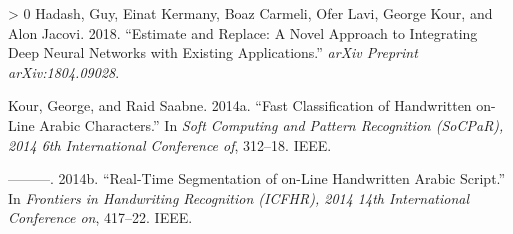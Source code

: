 \documentclass{article}
\newlength{\cslhangindent}
\newenvironment{CSLReferences}[3] %
 {%
  \setlength{\parindent}{0pt}
  \ifodd #1 \everypar{\setlength{\hangindent}{\cslhangindent}}\ignorespaces\fi
  \ifnum #2 > 0
  \setlength{\parskip}{#2\baselineskip}
  \fi
 }%
 {}
\begin{document}
\hypertarget{refs}{}
\begin{CSLReferences}{1}{0}
\leavevmode\hypertarget{ref-hadash2018estimate}{}%
Hadash, Guy, Einat Kermany, Boaz Carmeli, Ofer Lavi, George Kour, and
Alon Jacovi. 2018. {``Estimate and Replace: A Novel Approach to
Integrating Deep Neural Networks with Existing Applications.''}
\emph{arXiv Preprint arXiv:1804.09028}.

\leavevmode\hypertarget{ref-kour2014fast}{}%
Kour, George, and Raid Saabne. 2014a. {``Fast Classification of
Handwritten on-Line Arabic Characters.''} In \emph{Soft Computing and
Pattern Recognition (SoCPaR), 2014 6th International Conference of},
312--18. IEEE.

\leavevmode\hypertarget{ref-kour2014real}{}%
---------. 2014b. {``Real-Time Segmentation of on-Line Handwritten
Arabic Script.''} In \emph{Frontiers in Handwriting Recognition (ICFHR),
2014 14th International Conference on}, 417--22. IEEE.

\end{CSLReferences}



\end{document}
